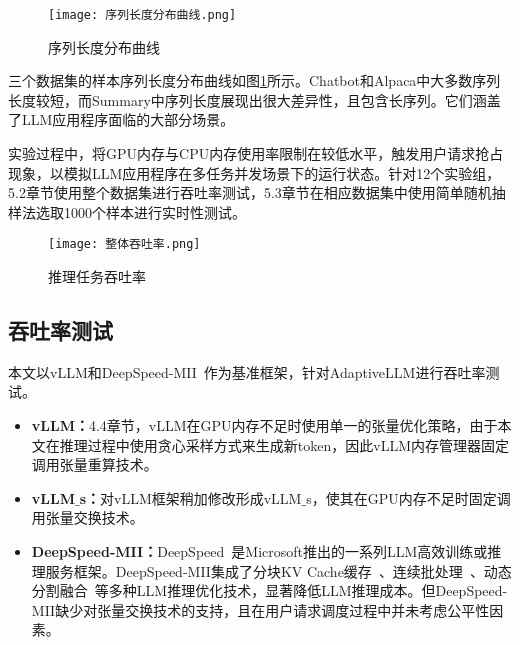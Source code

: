 \begin{figure}[!htbp]
  \centering
  \texttt{[image: 序列长度分布曲线.png]}
  \caption{序列长度分布曲线}
  \label{Fig:序列长度分布曲线}
\end{figure}

三个数据集的样本序列长度分布曲线如图\ref{Fig:序列长度分布曲线}所示。Chatbot和Alpaca中大多数序列长度较短，而Summary中序列长度展现出很大差异性，且包含长序列。它们涵盖了LLM应用程序面临的大部分场景。

实验过程中，将GPU内存与CPU内存使用率限制在较低水平，触发用户请求抢占现象，以模拟LLM应用程序在多任务并发场景下的运行状态。针对12个实验组，5.2章节使用整个数据集进行吞吐率测试，5.3章节在相应数据集中使用简单随机抽样法选取1000个样本进行实时性测试。

\begin{figure*}[!htbp]
  \centering
  \texttt{[image: 整体吞吐率.png]}
  \caption{推理任务吞吐率}
  \label{Fig:推理任务吞吐率}
\end{figure*}

\subsection{吞吐率测试}

本文以vLLM和DeepSpeed-MII~\cite{DeepSpeed-MII}作为基准框架，针对AdaptiveLLM进行吞吐率测试。

\begin{itemize}

  \item \textbf{vLLM：}4.4章节，vLLM在GPU内存不足时使用单一的张量优化策略，由于本文在推理过程中使用贪心采样方式来生成新token，因此vLLM内存管理器固定调用张量重算技术。
  
  \item \textbf{vLLM$\_$s：}对vLLM框架稍加修改形成vLLM$\_$s，使其在GPU内存不足时固定调用张量交换技术。
  
  \item \textbf{DeepSpeed-MII：}DeepSpeed~\cite{DeepSpeed}是Microsoft推出的一系列LLM高效训练或推理服务框架。DeepSpeed-MII集成了分块KV Cache缓存~\cite{vLLM}、连续批处理~\cite{Continuous-Batching}、动态分割融合~\cite{DeepSpeed-FastGen}等多种LLM推理优化技术，显著降低LLM推理成本。但DeepSpeed-MII缺少对张量交换技术的支持，且在用户请求调度过程中并未考虑公平性因素。
  
\end{itemize}

